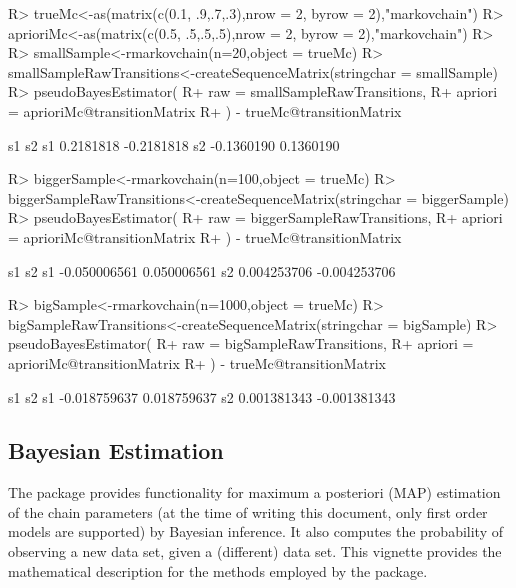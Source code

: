 \documentclass[
  nojss]{jss}
\begin{document}
\begin{CodeChunk}

\begin{CodeInput}
R> trueMc<-as(matrix(c(0.1, .9,.7,.3),nrow = 2, byrow = 2),"markovchain")
R> aprioriMc<-as(matrix(c(0.5, .5,.5,.5),nrow = 2, byrow = 2),"markovchain")
R> 
R> smallSample<-rmarkovchain(n=20,object = trueMc)
R> smallSampleRawTransitions<-createSequenceMatrix(stringchar = smallSample)
R> pseudoBayesEstimator(
R+   raw = smallSampleRawTransitions, 
R+   apriori = aprioriMc@transitionMatrix
R+ ) - trueMc@transitionMatrix
\end{CodeInput}

\begin{CodeOutput}
           s1         s2
s1  0.2181818 -0.2181818
s2 -0.1360190  0.1360190
\end{CodeOutput}

\begin{CodeInput}
R> biggerSample<-rmarkovchain(n=100,object = trueMc)
R> biggerSampleRawTransitions<-createSequenceMatrix(stringchar = biggerSample)
R> pseudoBayesEstimator(
R+   raw = biggerSampleRawTransitions,
R+   apriori = aprioriMc@transitionMatrix
R+ ) - trueMc@transitionMatrix
\end{CodeInput}

\begin{CodeOutput}
             s1           s2
s1 -0.050006561  0.050006561
s2  0.004253706 -0.004253706
\end{CodeOutput}

\begin{CodeInput}
R> bigSample<-rmarkovchain(n=1000,object = trueMc)
R> bigSampleRawTransitions<-createSequenceMatrix(stringchar = bigSample)
R> pseudoBayesEstimator(
R+   raw = bigSampleRawTransitions,
R+   apriori = aprioriMc@transitionMatrix
R+ ) - trueMc@transitionMatrix
\end{CodeInput}

\begin{CodeOutput}
             s1           s2
s1 -0.018759637  0.018759637
s2  0.001381343 -0.001381343
\end{CodeOutput}
\end{CodeChunk}

\hypertarget{bayesian-estimation}{%
\subsection{Bayesian Estimation}\label{bayesian-estimation}}

The  package provides functionality for maximum a posteriori (MAP) estimation of the chain parameters (at the time of writing this document, only first order models are supported) by Bayesian inference. It also computes the probability of observing a new data set, given a (different) data set. This vignette provides the mathematical description for the methods employed by the package.
\end{document}
